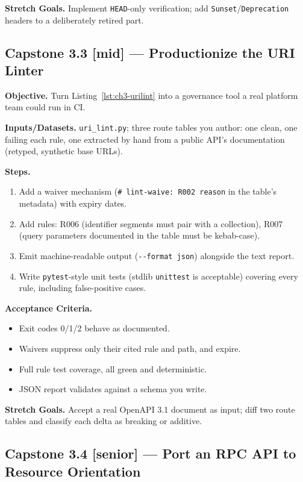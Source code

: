 \textbf{Stretch Goals.} Implement \texttt{HEAD}-only verification; add
\texttt{Sunset}/\texttt{Deprecation} headers to a deliberately retired part.

\subsection{Capstone 3.3 [mid] --- Productionize the URI Linter}

\textbf{Objective.} Turn Listing~\ref{lst:ch3-urilint} into a governance tool a
real platform team could run in CI.

\textbf{Inputs/Datasets.} \texttt{uri\_lint.py}; three route tables you author:
one clean, one failing each rule, one extracted by hand from a public API's
documentation (retyped, synthetic base URLs).

\textbf{Steps.}
\begin{enumerate}
  \item Add a waiver mechanism (\texttt{\# lint-waive: R002 reason} in the
        table's metadata) with expiry dates.
  \item Add rules: R006 (identifier segments must pair with a collection),
        R007 (query parameters documented in the table must be kebab-case).
  \item Emit machine-readable output (\texttt{-{}-format json}) alongside the
        text report.
  \item Write \texttt{pytest}-style unit tests (stdlib \texttt{unittest} is
        acceptable) covering every rule, including false-positive cases.
\end{enumerate}

\textbf{Acceptance Criteria.}
\begin{itemize}
  \item[$\square$] Exit codes 0/1/2 behave as documented.
  \item[$\square$] Waivers suppress only their cited rule and path, and expire.
  \item[$\square$] Full rule test coverage, all green and deterministic.
  \item[$\square$] JSON report validates against a schema you write.
\end{itemize}

\textbf{Stretch Goals.} Accept a real OpenAPI 3.1 document as input; diff two
route tables and classify each delta as breaking or additive.

\subsection{Capstone 3.4 [senior] --- Port an RPC API to Resource Orientation}

